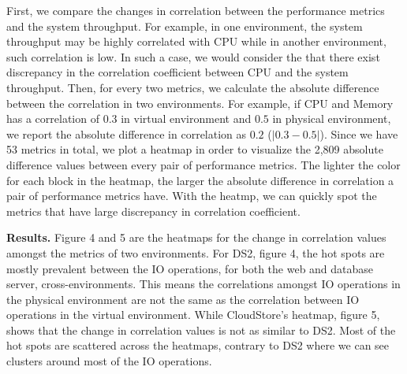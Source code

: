 First, we compare the changes in correlation between the performance metrics and the system throughput. For example, in one environment, the system throughput may be highly correlated with CPU while in another environment, such correlation is low. In such a case, we would consider the that there exist discrepancy in the correlation coefficient between CPU and the system throughput. Then, for every two metrics, we calculate the absolute difference between the correlation in two environments. For example, if CPU and Memory has a correlation of $0.3$ in virtual environment and $0.5$ in physical environment, we report the absolute difference in correlation as $0.2$ ($|0.3-0.5|$). Since we have 53 metrics in total, we plot a heatmap in order to visualize the 2,809 absolute difference values between every pair of performance metrics. The lighter the color for each block in the heatmap, the larger the absolute difference in correlation a pair of performance metrics have. With the heatmp, we can quickly spot the metrics that have large discrepancy in correlation coefficient. 




\textbf{Results.} Figure 4 and 5 are the heatmaps for the change in correlation values amongst the metrics of two environments. For DS2, figure 4, the hot spots are mostly prevalent between the IO operations, for both the web and database server, cross-environments. This means the correlations amongst IO operations in the physical environment are not the same as the correlation between IO operations in the virtual environment. While CloudStore's heatmap, figure 5, shows that the change in correlation values is not as similar to DS2. Most of the hot spots are scattered across the heatmaps, contrary to DS2 where we can see clusters around most of the IO operations. 


